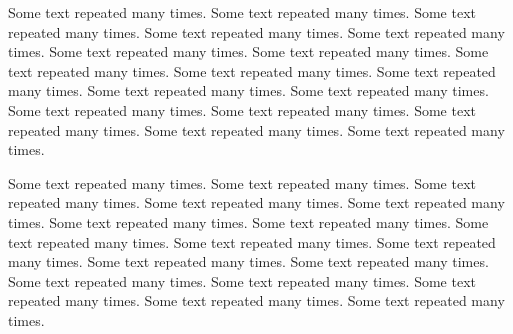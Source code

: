 
Some text repeated many times. Some text repeated many times. Some text repeated many times. Some text repeated many times. Some text repeated many times. Some text repeated many times. Some text repeated many times. Some text repeated many times. Some text repeated many times. Some text repeated many times. Some text repeated many times. Some text repeated many times. Some text repeated many times. Some text repeated many times. Some text repeated many times. Some text repeated many times. Some text repeated many times. 


Some text repeated many times. Some text repeated many times. Some text repeated many times. Some text repeated many times. Some text repeated many times. Some text repeated many times. Some text repeated many times. Some text repeated many times. Some text repeated many times. Some text repeated many times. Some text repeated many times. Some text repeated many times. Some text repeated many times. Some text repeated many times. Some text repeated many times. Some text repeated many times. Some text repeated many times. 

